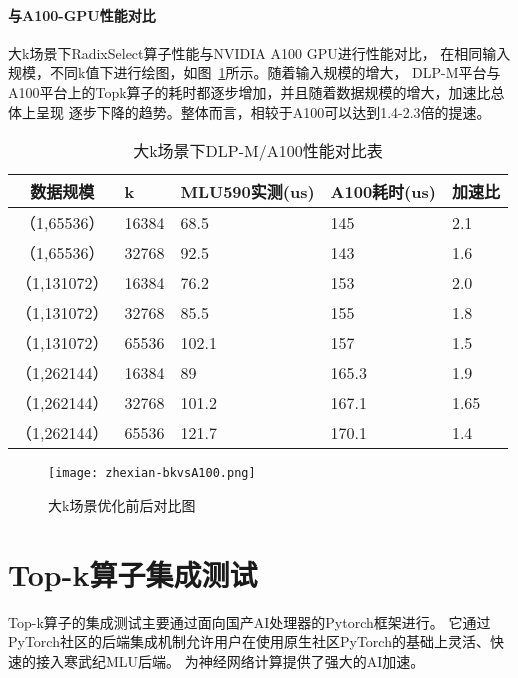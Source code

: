 \paragraph{与A100-GPU性能对比}
大k场景下RadixSelect算子性能与NVIDIA A100 GPU进行性能对比，
在相同输入规模，不同k值下进行绘图，如图~\ref{fig:bench_bk_vsa100_zhexian}所示。随着输入规模的增大，
DLP-M平台与A100平台上的Topk算子的耗时都逐步增加，并且随着数据规模的增大，加速比总体上呈现
逐步下降的趋势。整体而言，相较于A100可以达到1.4-2.3倍的提速。
\begin{table}
    \centering
    \caption{大k场景下DLP-M/A100性能对比表}
    \begin{tabular}{cllll}
    \toprule
    数据规模 & k &   MLU590实测(us) & A100耗时(us) & 加速比 \\
    \midrule
    （1,65536） & 16384    & 68.5 & 145 & 2.1 \\
    （1,65536） & 32768   & 92.5 & 143 & 1.6 \\

    （1,131072） & 16384    & 76.2 & 153 & 2.0 \\
    （1,131072） & 32768   & 85.5 & 155 & 1.8 \\
    （1,131072） & 65536   & 102.1 & 157 & 1.5 \\
    
    （1,262144） & 16384   & 89 & 165.3 & 1.9 \\
    （1,262144） & 32768   & 101.2 & 167.1 & 1.65 \\
    （1,262144） & 65536   & 121.7 & 170.1 & 1.4 \\
    

    \bottomrule
    \end{tabular}
    \end{table}


    \begin{figure}[ht]
        \centering
        \texttt{[image: zhexian-bkvsA100.png]}
        \caption{大k场景优化前后对比图}
        \label{fig:bench_bk_vsa100_zhexian}
    \end{figure}
    
  

\section{Top-k算子集成测试}
Top-k算子的集成测试主要通过面向国产AI处理器的Pytorch框架进行。
它通过PyTorch社区的后端集成机制允许用户在使用原生社区PyTorch的基础上灵活、快速的接入寒武纪MLU后端。
为神经网络计算提供了强大的AI加速。


